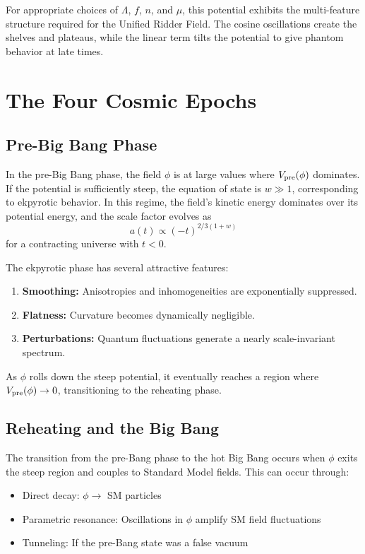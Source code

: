 \documentclass[twocolumn,showpacs,preprintnumbers,amsmath,amssymb,prd]{revtex4-2}
\begin{document}
For appropriate choices of $\Lambda$, $f$, $n$, and $\mu$, this potential exhibits the multi-feature structure required for the Unified Ridder Field. The cosine oscillations create the shelves and plateaus, while the linear term tilts the potential to give phantom behavior at late times.

\section{The Four Cosmic Epochs}
\label{sec:epochs}

\subsection{Pre-Big Bang Phase}

In the pre-Big Bang phase, the field $\phi$ is at large values where $V_{\rm pre}(\phi)$ dominates. If the potential is sufficiently steep, the equation of state is $w \gg 1$, corresponding to ekpyrotic behavior. In this regime, the field's kinetic energy dominates over its potential energy, and the scale factor evolves as
\begin{equation}
a(t) \propto (-t)^{2/3(1+w)}
\end{equation}
for a contracting universe with $t < 0$.

The ekpyrotic phase has several attractive features:
\begin{enumerate}
    \item \textbf{Smoothing:} Anisotropies and inhomogeneities are exponentially suppressed.
    \item \textbf{Flatness:} Curvature becomes dynamically negligible.
    \item \textbf{Perturbations:} Quantum fluctuations generate a nearly scale-invariant spectrum.
\end{enumerate}

As $\phi$ rolls down the steep potential, it eventually reaches a region where $V_{\rm pre}(\phi) \to 0$, transitioning to the reheating phase.

\subsection{Reheating and the Big Bang}

The transition from the pre-Bang phase to the hot Big Bang occurs when $\phi$ exits the steep region and couples to Standard Model fields. This can occur through:
\begin{itemize}
    \item Direct decay: $\phi \to$ SM particles
    \item Parametric resonance: Oscillations in $\phi$ amplify SM field fluctuations
    \item Tunneling: If the pre-Bang state was a false vacuum
\end{itemize}
\end{document}
